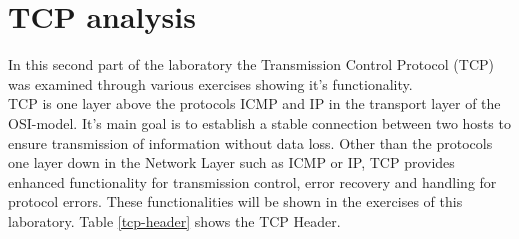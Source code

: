 \chapter{TCP analysis}
\label{tcp}
In this second part of the laboratory the Transmission Control Protocol (TCP) was examined through various exercises showing it's functionality.\\
TCP is one layer above the protocols ICMP and IP in the transport layer of the OSI-model. It's main goal is to establish a stable connection between two hosts to ensure transmission of information without data loss. Other than the protocols one layer down in the Network Layer such as ICMP or IP, TCP provides enhanced functionality for transmission control, error recovery and handling for protocol errors. These functionalities will be shown in the exercises of this laboratory. Table \ref{tcp-header} shows the TCP Header.
